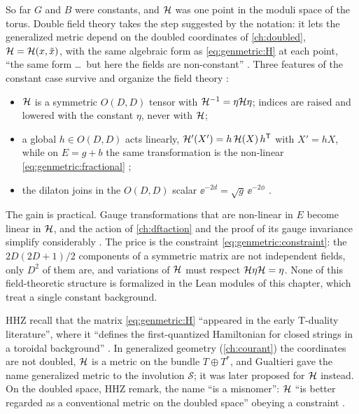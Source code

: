 So far $G$ and $B$ were constants, and $\mathcal{H}$ was one point in the moduli space of the torus.
Double field theory takes the step suggested by the notation: it lets the generalized
metric depend on the doubled coordinates of \cref{ch:doubled}, $\mathcal{H}=\mathcal{H}(x,\tilde x)$, with
the same algebraic form as \eqref{eq:genmetric:H} at each point,
``the same form \dots\ but here the fields are non-constant''
. Three features of the constant case
survive and organize the field theory :
\begin{itemize}[nosep]
\item $\mathcal{H}$ is a symmetric $O(D,D)$ tensor with
 $\mathcal{H}^{-1}=\eta\mathcal{H}\eta$; indices are raised and lowered with the constant $\eta$, never
 with $\mathcal{H}$;
\item a global $h\in O(D,D)$ acts linearly, $\mathcal{H}'(X')=h\,\mathcal{H}(X)\,h^{\mathsf T}$ with
 $X'=hX$, while on $E=g+b$ the same transformation is the non-linear
 \eqref{eq:genmetric:fractional} ;
\item the dilaton joins in the $O(D,D)$ scalar $\ee^{-2d}=\sqrt{g}\,\ee^{-2\phi}$
 .
\end{itemize}
The gain is practical. Gauge transformations that are non-linear in $E$ become linear in
$\mathcal{H}$, and the action of \cref{ch:dftaction} and the proof of its gauge invariance simplify
considerably . The price is the constraint
\eqref{eq:genmetric:constraint}: the $2D(2D+1)/2$ components of a symmetric matrix are not
independent fields, only $D^2$ of them are, and variations of $\mathcal{H}$ must respect
$\mathcal{H}\eta\mathcal{H}=\eta$. None of this field-theoretic structure is formalized in the
Lean modules of this chapter, which treat a single constant background.

\begin{historybox}
HHZ recall that the matrix \eqref{eq:genmetric:H} ``appeared in the early T-duality
literature'', where it ``defines the first-quantized Hamiltonian for closed strings in a
toroidal background'' . In generalized geometry
(\cref{ch:courant}) the coordinates are not doubled, $\mathcal{H}$ is a metric on the bundle
$T\oplus T^*$, and Gualtieri gave the name generalized metric to the involution
$\mathcal S$; it was later proposed for $\mathcal{H}$ instead. On the doubled space, HHZ remark,
the name ``is a misnomer'': $\mathcal{H}$ ``is better regarded as a conventional metric on the
doubled space'' obeying a constraint .
\end{historybox}


